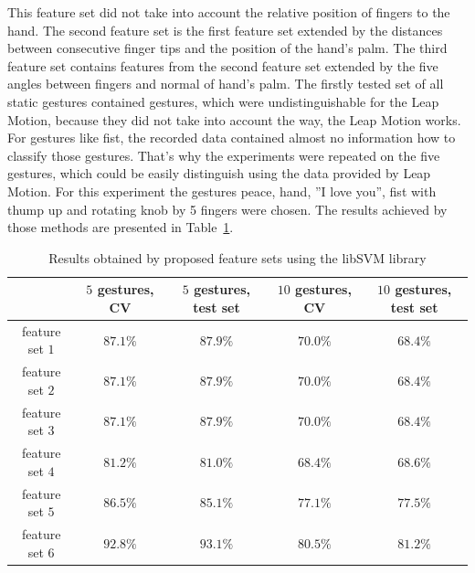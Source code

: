 This feature set did not take into account the relative position of fingers to the hand.
The second feature set is the first feature set extended by the distances between consecutive finger tips and the position of the hand's palm.
The third feature set contains features from the second feature set extended by the five angles between fingers and normal of hand's palm.
The firstly tested set of all static gestures contained gestures, which were undistinguishable for the Leap Motion, because they did not take into account the way, the Leap Motion works. 
For gestures like fist, the recorded data contained almost no information how to classify those gestures.
That's why the experiments were repeated on the five gestures, which could be easily distinguish using the data provided by Leap Motion. 
For this experiment the gestures peace, hand, ''I love you'', fist with thump up and rotating knob by 5 fingers were chosen.
The results achieved by those methods are presented in Table~\ref{staticfeat}.

\begin{table}[htp!]
	\label{staticfeat}
	\caption{Results obtained by proposed feature sets using the libSVM library}
    \begin{tabular}{ccccc}
    \hline
    ~                                                   & $5$ gestures, CV & $5$ gestures, test set & $10$ gestures, CV  & $10$ gestures, test set \\ \hline
    feature set $1$                     & $87.1\%$ & $87.9\%$ & $70.0\%$ & $68.4\%$   \\ \hline
    feature set $2$                     & $87.1\%$ & $87.9\%$ & $70.0\%$ & $68.4\%$          \\ \hline
    feature set $3$                     & $87.1\%$ & $87.9\%$ & $70.0\%$ & $68.4\%$           \\ \hline
    feature set $4$                     & $81.2\%$ & $81.0\%$ & $68.4\%$ & $68.6\%$          \\ \hline
    feature set $5$                     & $86.5\%$ & $85.1\%$ & $77.1\%$ & $77.5\%$          \\ \hline
    feature set $6$                     & $92.8\%$ & $93.1\%$ & $80.5\%$ & $81.2\%$           \\ \hline
    \end{tabular}
\end{table}

